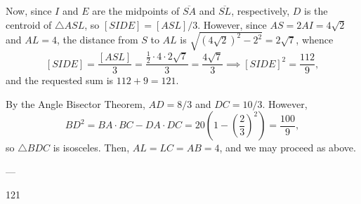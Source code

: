 Now, since $I$ and $E$ are the midpoints of $\overline{SA}$ and $\overline{SL}$, respectively, $D$ is the centroid of $\triangle ASL$, so $[SIDE]=[ASL]/3$. However, since $AS=2AI=4\sqrt2$ and $AL=4$, the distance from $S$ to $AL$ is $\sqrt{(4\sqrt2)^2-2^2}=2\sqrt7$, whence \[[SIDE]=\frac{[ASL]}3=\frac{\frac12\cdot 4\cdot 2\sqrt7}3=\frac{4\sqrt7}3\implies [SIDE]^2=\frac{112}9,\]
and the requested sum is $112+9=121$.

\begin{remark}
    By the Angle Bisector Theorem, $AD=8/3$ and $DC=10/3$. However, \[BD^2=BA\cdot BC-DA\cdot DC=20\left(1-\left(\frac23\right)^2\right)=\frac{100}9,\]
    so $\triangle BDC$ is isosceles. Then, $AL=LC=AB=4$, and we may proceed as above.
\end{remark}

---

121
